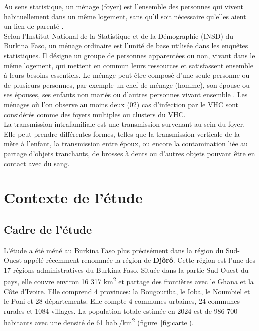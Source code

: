 \documentclass[a4paper,12pt]{article}
\begin{document}
Au sens statistique, un ménage (foyer) est l'ensemble des personnes qui vivent habituellement dans un même logement, sans qu'il soit nécessaire qu'elles aient un lien de parenté \cite{MenageInsee}. \\
Selon l'Institut National de la Statistique et de la Démographie (INSD) du Burkina Faso, un ménage ordinaire est l'unité de base utilisée dans les enquêtes statistiques. Il désigne un groupe de personnes apparentées ou non, vivant dans le même logement, qui mettent en commun leurs ressources et satisfassent ensemble à leurs besoins essentiels. Le ménage peut être composé d’une seule personne ou de plusieurs personnes, par exemple un chef de ménage (homme), son épouse  ou ses épouses, ses enfants non mariés ou d’autres personnes vivant ensemble \cite{BurkinaFasoRecensement}. Les ménages où l'on observe au moins deux (02) cas d'infection par le VHC sont considérés comme des foyers multiples ou clusters du VHC. \\


La transmission intrafamiliale est une transmission survenant au sein du foyer. Elle peut prendre différentes formes, telles que la transmission verticale de la mère à l’enfant, la transmission entre époux, ou encore la contamination liée au partage d’objets tranchants, de brosses à dents ou d’autres objets pouvant être en contact avec du sang.

\newpage 

\section{Contexte de l'étude}


\subsection{Cadre de l'étude}
L'étude a été méné au Burkina Faso plus précisément dans la région du Sud-Ouest appélé récemment renommée la région de \textbf{Djôrô}. Cette région est l’une des 17 régions administratives du Burkina Faso. Située dans la partie Sud-Ouest du pays, elle  couvre environ 16 317 km\textsuperscript{2} et partage des frontières avec le Ghana et la Côte d’Ivoire. Elle comprend 4 provinces: la Bougouriba, le Ioba, le Noumbiel et le Poni et 28 départements. Elle compte 4 communes urbaines, 24 communes rurales et 1084 villages. La population totale estimée en 2024 est de 986 700  habitants avec une densité de 61 hab./km\textsuperscript{2} \cite{Djoro2026} (figure~\ref{fig:carte}).
\end{document}
